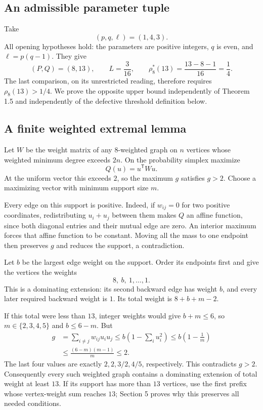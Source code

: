 \documentclass[10pt]{article}
\begin{document}
\subsection*{An admissible parameter tuple}
Take \[(p,q,\ell)=(1,4,3).\] All opening hypotheses hold: the parameters are positive integers, \(q\) is even, and \(\ell=p(q-1)\). They give \[(P,Q)=(8,13),\qquad L=\frac3{16},\qquad
 \rho_8^*(13)=\frac{13-8-1}{16}=\frac14.\] The last comparison, on its unrestricted reading, therefore requires \(\rho_8(13)>1/4\). We prove the opposite upper bound independently of Theorem 1.5 and independently of the defective threshold definition below.\par
\subsection*{A finite weighted extremal lemma}
Let \(W\) be the weight matrix of any \(8\)-weighted graph on \(n\) vertices whose weighted minimum degree exceeds \(2n\). On the probability simplex maximize \[Q(u)=u^{\mathsf T}Wu.\] At the uniform vector this exceeds \(2\), so the maximum \(g\) satisfies \(g>2\). Choose a maximizing vector with minimum support size \(m\).\par
Every edge on this support is positive. Indeed, if \(w_{ij}=0\) for two positive coordinates, redistributing \(u_i+u_j\) between them makes \(Q\) an affine function, since both diagonal entries and their mutual edge are zero. An interior maximum forces that affine function to be constant. Moving all the mass to one endpoint then preserves \(g\) and reduces the support, a contradiction.\par
Let \(b\) be the largest edge weight on the support. Order its endpoints first and give the vertices the weights \[8,\ b,\ 1,\ldots,1.\] This is a dominating extension: its second backward edge has weight \(b\), and every later required backward weight is \(1\). Its total weight is \(8+b+m-2\).\par
If this total were less than \(13\), integer weights would give \(b+m\leq6\), so \(m\in\{2,3,4,5\}\) and \(b\leq6-m\). But \[\begin{split}
 g&=\sum_{i\ne j}w_{ij}u_i u_j
 \leq b\left(1-\sum_i u_i^2\right)
 \leq b\left(1-\frac1m\right)\\
 &\leq \frac{(6-m)(m-1)}m\leq2.
 \end{split}\] The last four values are exactly \(2,2,3/2,4/5\), respectively. This contradicts \(g>2\). Consequently every such weighted graph contains a dominating extension of total weight at least \(13\). If its support has more than \(13\) vertices, use the first prefix whose vertex-weight sum reaches \(13\); Section 5 proves why this preserves all needed conditions.\par
\end{document}
